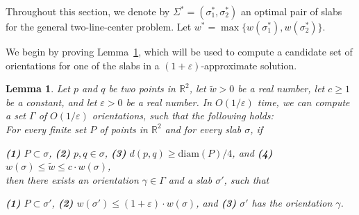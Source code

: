 \documentclass[10pt,a4paper]{article}
\newtheorem{lemma}[theorem]{Lemma}
\theoremstyle{star}
\theoremstyle{claimstar}
\newcommand{\eps}{\ensuremath{\varepsilon}}
\newcommand{\mytxt}[1]{\textup{\textbf{\textsf{\textcolor{lipicsGray}{#1}}}}}
\newcommand{\diam}{\ensuremath{\mathrm{diam}}}
\begin{document}
Throughout this section, we denote by $\Sigma^* = (\sigma_1^*, \sigma_2^*)$ an optimal pair of slabs for the general two-line-center problem. Let $w^* = \max \{w(\sigma_1^*), w(\sigma_2^*) \}$.


We begin by proving Lemma~\ref{lem:angles}, which will be used to compute a candidate set of orientations for one of the slabs in a $(1+\eps)$-approximate solution.



\begin{lemma}
    \label{lem:angles}
    Let $p$ and $q$ be two points in $\mathbb R^2$, let $\widetilde w > 0$ be  a real number, let $c\ge 1$ be a constant, and let $\eps> 0$ be a real number.
    In $O(1/\eps)$ time, we can compute a set $\Gamma$ of $O(1/\eps)$ orientations, such that the following holds:\\
    For every finite set $P$ of points in $\mathbb R^2$ and for every slab $\sigma$, if 
    
    \mytxt{(1)} $P\subset \sigma$, 
    \mytxt{(2)} $p, q \in \sigma$, 
    \mytxt{(3)} $d(p,q) \ge \diam(P)/4$, and
    \mytxt{(4)} $w(\sigma) \le \widetilde w \le c\cdot w(\sigma)$,
    \\then there exists an orientation $\gamma\in \Gamma$ and a slab $\sigma'$, such that
    
    \mytxt{(1)} $P \subset \sigma'$, 
    \mytxt{(2)} $w(\sigma') \le (1+ \eps) \cdot w(\sigma)$, and
    \mytxt{(3)} $\sigma'$ has the orientation $\gamma$.
\end{lemma}
\end{document}
